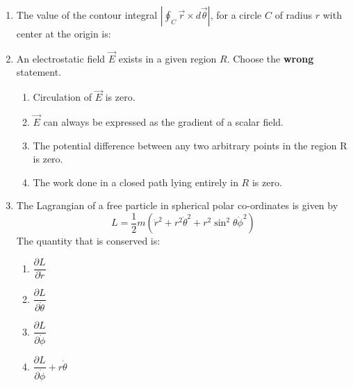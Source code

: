 \documentclass[14pt, a4paper]{extarticle}
\begin{document}
\begin{enumerate}[label=\textbf{Q. \arabic*}]

\item The value of the contour integral
    $ \displaystyle \left| \oint_C \vec{r} \times d\vec{\theta} \right| $,
    for a circle $C$ of radius $r$ with center at the origin is:
  
    \begin{enumerate}[label=(\Alph*)]
    \end{enumerate}

\item An electrostatic field $\vec{E}$ exists in a given region $R$. Choose the \textbf{wrong} statement.
   
    \begin{enumerate}[label=(\Alph*)]
        \item Circulation of $\vec{E}$ is zero.
        \item $\vec{E}$ can always be expressed as the gradient of a scalar field.
        \item The potential difference between any two arbitrary points in the region R is zero.
        \item The work done in a closed path lying entirely in $R$ is zero.   
    \end{enumerate}


\item The Lagrangian of a free particle in spherical polar co-ordinates is given by
    \[ L = \frac{1}{2}m(\dot{r}^2 + r^2\dot{\theta}^2 + r^2\sin^2\theta\dot{\phi}^2) \]
    The quantity that is conserved is:
    \begin{multicols}{2}
    \begin{enumerate}[label=(\Alph*)]
        \item $\dfrac{\partial L}{\partial \dot{r}}$
        \item $\dfrac{\partial L}{\partial \dot{\theta}}$
        \item $\dfrac{\partial L}{\partial \dot{\phi}}$
        \item $\dfrac{\partial L}{\partial \dot{\phi}} + r \dot{\theta}$
    \end{enumerate}
    \end{multicols}


\end{enumerate}
\end{document}
